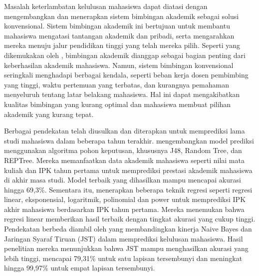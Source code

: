 Masalah keterlambatan kelulusan mahasiswa dapat diatasi dengan mengembangkan dan menerapkan sistem bimbingan akademik sebagai solusi konvensional. Sistem bimbingan akademik ini bertujuan untuk membantu mahasiswa mengatasi tantangan akademik dan pribadi, serta mengarahkan mereka menuju jalur pendidikan tinggi yang telah mereka pilih. Seperti yang dikemukakan oleh \cite{elcullada2018academic}, bimbingan akademik dianggap sebagai bagian penting dari keberhasilan akademik mahasiswa. Namun, sistem bimbingan konvensional seringkali menghadapi berbagai kendala, seperti beban kerja dosen pembimbing yang tinggi, waktu pertemuan yang terbatas, dan kurangnya pemahaman menyeluruh tentang latar belakang mahasiswa. Hal ini dapat mengakibatkan kualitas bimbingan yang kurang optimal dan mahasiswa membuat pilihan akademik yang kurang tepat. 

Berbagai pendekatan telah diusulkan dan diterapkan untuk memprediksi lama studi mahasiswa dalam beberapa tahun terakhir. \cite{alyahyan2020decision} mengembangkan model prediksi menggunakan algoritma pohon keputusan, khususnya J48, Random Tree, dan REPTree. Mereka memanfaatkan data akademik mahasiswa seperti nilai mata kuliah dan IPK tahun pertama untuk memprediksi prestasi akademik mahasiswa di akhir masa studi. Model terbaik yang dihasilkan mampu mencapai akurasi hingga 69,3\%. Sementara itu, \cite{danbatta2020predicting} menerapkan beberapa teknik regresi seperti regresi linear, eksponensial, logaritmik, polinomial dan power untuk memprediksi IPK akhir mahasiswa berdasarkan IPK tahun pertama. Mereka menemukan bahwa regresi linear memberikan hasil terbaik dengan tingkat akurasi yang cukup tinggi. Pendekatan berbeda diambil oleh \cite{olalekan2020performance} yang membandingkan kinerja Naive Bayes dan Jaringan Syaraf Tiruan (JST) dalam memprediksi kelulusan mahasiswa. Hasil penelitian mereka menunjukkan bahwa JST mampu menghasilkan akurasi yang lebih tinggi, mencapai 79,31\% untuk satu lapisan tersembunyi dan meningkat hingga 99,97\% untuk empat lapisan tersembunyi.

